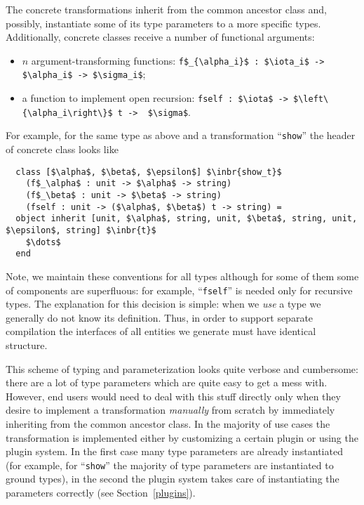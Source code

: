 The concrete transformations inherit from the common ancestor class and, possibly, instantiate some of its type parameters to a more
specific types. Additionally, concrete classes receive a number of functional arguments:

\begin{itemize}
\item $n$ argument-transforming functions: \lstinline|f$_{\alpha_i}$ : $\iota_i$ -> $\alpha_i$ -> $\sigma_i$|;
\item a function to implement open recursion: \lstinline|fself : $\iota$ -> $\left\{\alpha_i\right\}$ t ->  $\sigma$|.
\end{itemize}

For example, for the same type as above and a transformation ``\lstinline{show}'' the header of concrete class looks like

\begin{lstlisting}
  class [$\alpha$, $\beta$, $\epsilon$] $\inbr{show_t}$ 
    (f$_\alpha$ : unit -> $\alpha$ -> string)
    (f$_\beta$ : unit -> $\beta$ -> string)
    (fself : unit -> ($\alpha$, $\beta$) t -> string) =
  object inherit [unit, $\alpha$, string, unit, $\beta$, string, unit, $\epsilon$, string] $\inbr{t}$
    $\dots$
  end 
\end{lstlisting}

Note, we maintain these conventions for all types although for some of them some of components are superfluous: for example, ``\lstinline{fself}''
is needed only for recursive types. The explanation for this decision is simple: when we \emph{use} a type we generally do not know its
definition. Thus, in order to support separate compilation the interfaces of all entities we generate must have identical structure.

This scheme of typing and parameterization looks quite verbose and cumbersome: there are a lot of type parameters which are quite easy to get a mess with. However, end
users would need to deal with this stuff directly only when they desire to implement a transformation \emph{manually} from scratch by immediately inheriting from the common ancestor class.
In the majority of use cases the transformation is implemented either by customizing a certain plugin or using the plugin system. In the first case many
type parameters are already instantiated (for example, for ``\lstinline{show}'' the majority of type parameters are instantiated to ground types), in the
second the plugin system takes care of instantiating the parameters correctly (see Section~\ref{plugins}).

